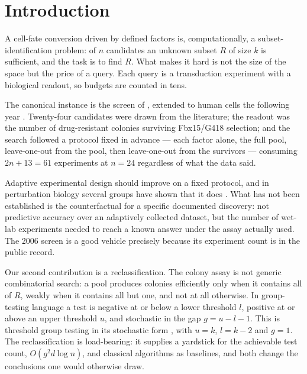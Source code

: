 \documentclass[10pt]{article}
\begin{document}
\section{Introduction}

A cell-fate conversion driven by defined factors is, computationally, a
subset-identification problem: of $n$ candidates an unknown subset $R$ of size
$k$ is sufficient, and the task is to find $R$. What makes it hard is not the
size of the space but the price of a query. Each query is a transduction
experiment with a biological readout, so budgets are counted in tens.

The canonical instance is the screen of \citet{takahashi2006}, extended to
human cells the following year \citep{takahashi2007}. Twenty-four candidates
were drawn from the literature; the readout was the number of drug-resistant
colonies surviving Fbx15/G418 selection; and the search followed a protocol
fixed in advance --- each factor alone, the full pool, leave-one-out from the
pool, then leave-one-out from the survivors --- consuming $2n + 13 = 61$
experiments at $n = 24$ regardless of what the data said.

Adaptive experimental design \citep{lindley1956, chaloner1995, rainforth2024}
should improve on a fixed protocol, and in perturbation biology several groups
have shown that it does \citep{zhang2023, tosh2025}. What has not been
established is the counterfactual for a specific documented discovery: not
predictive accuracy over an adaptively collected dataset, but the number of
wet-lab experiments needed to reach a known answer under the assay actually
used. The 2006 screen is a good vehicle precisely because its experiment count
is in the public record.

Our second contribution is a reclassification. The colony assay is not generic
combinatorial search: a pool produces colonies efficiently only when it
contains all of $R$, weakly when it contains all but one, and not at all
otherwise. In group-testing language \citep{dorfman1943, aldridge2019} a test
is negative at or below a lower threshold $l$, positive at or above an upper
threshold $u$, and stochastic in the gap $g = u - l - 1$. This is threshold
group testing \citep{damaschke2006} in its stochastic form \citep{chan2013},
with $u = k$, $l = k-2$ and $g = 1$. The reclassification is load-bearing: it
supplies a yardstick for the achievable test count, $O(g^2 d \log n)$, and
classical algorithms as baselines, and both change the conclusions one would
otherwise draw.
\end{document}
